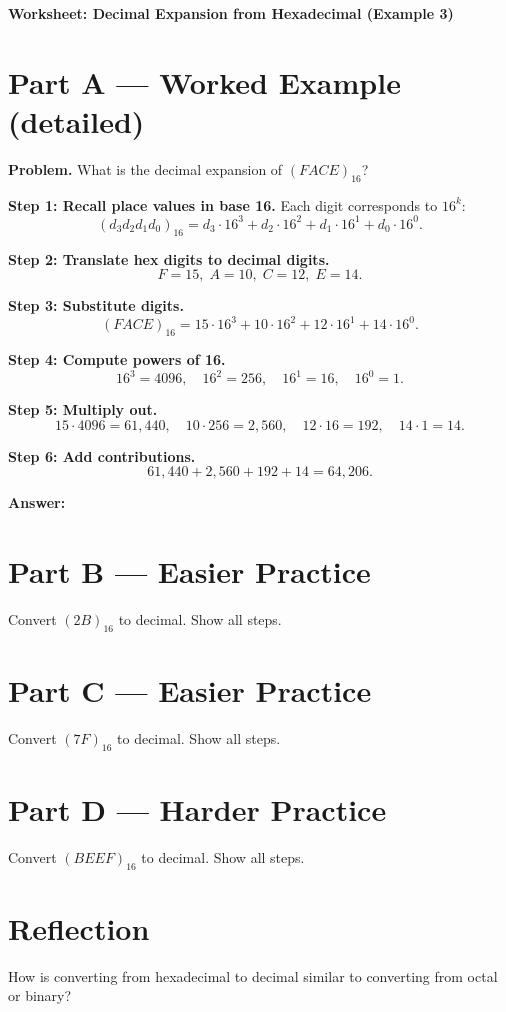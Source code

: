 \documentclass[12pt]{article}
\begin{document}
\begin{center}
\Large\textbf{Worksheet: Decimal Expansion from Hexadecimal (Example 3)}
\end{center}

\section*{Part A — Worked Example (detailed)}

\textbf{Problem.} What is the decimal expansion of $(FACE)_{16}$?

\textbf{Step 1: Recall place values in base 16.}
Each digit corresponds to $16^k$:
\[
(d_3d_2d_1d_0)_{16} = d_3 \cdot 16^3 + d_2 \cdot 16^2 + d_1 \cdot 16^1 + d_0 \cdot 16^0.
\]

\textbf{Step 2: Translate hex digits to decimal digits.}
\[
F = 15,\; A = 10,\; C = 12,\; E = 14.
\]

\textbf{Step 3: Substitute digits.}
\[
(FACE)_{16} = 15\cdot 16^3 + 10\cdot 16^2 + 12\cdot 16^1 + 14\cdot 16^0.
\]

\textbf{Step 4: Compute powers of 16.}
\[
16^3=4096,\quad 16^2=256,\quad 16^1=16,\quad 16^0=1.
\]

\textbf{Step 5: Multiply out.}
\[
15\cdot 4096 = 61{,}440,\quad 10\cdot 256 = 2{,}560,\quad 12\cdot 16 = 192,\quad 14\cdot 1 = 14.
\]

\textbf{Step 6: Add contributions.}
\[
61{,}440 + 2{,}560 + 192 + 14 = 64{,}206.
\]

\textbf{Answer:} 

\section*{Part B — Easier Practice}
Convert $(2B)_{16}$ to decimal. Show all steps.

\vspace{2cm}

\section*{Part C — Easier Practice}
Convert $(7F)_{16}$ to decimal. Show all steps.

\vspace{2cm}

\section*{Part D — Harder Practice}
Convert $(BEEF)_{16}$ to decimal. Show all steps.

\vspace{3cm}

\section*{Reflection}
How is converting from hexadecimal to decimal similar to converting from octal or binary?
\end{document}
